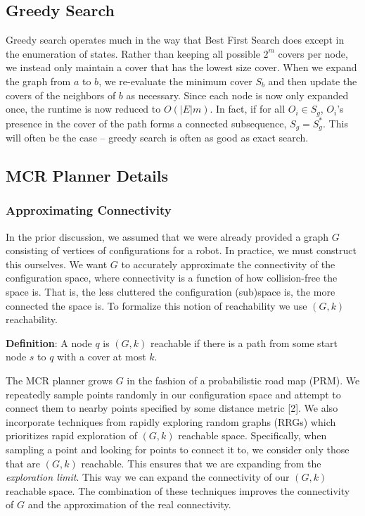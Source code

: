 \subsection{Greedy Search}
Greedy search operates much in the way that Best First Search does except in the enumeration of states. Rather than keeping all possible $2^m$ covers per node, we instead only maintain a cover that has the lowest size cover. When we expand the graph from $a$ to $b$, we re-evaluate the minimum cover $S_b$ and then update the covers of the neighbors of $b$ as necessary. Since each node is now only expanded once, the runtime is now reduced to $O(|E|m)$. In fact, if for all $O_i \in S_g$, $O_i$'s presence in the cover of the path forms a connected subsequence, $S_g = S^{*}_g$. This will often be the case -- greedy search is often as good as exact search.

\subsection{MCR Planner Details}
\subsubsection{Approximating Connectivity}
In the prior discussion, we assumed that we were already provided a graph $G$ consisting of vertices of configurations for a robot. In practice, we must construct this ourselves. We want $G$ to accurately approximate the connectivity of the configuration space, where connectivity is a function of how collision-free the space is. That is, the less cluttered the configuration (sub)space is, the more connected the space is. To formalize this notion of reachability we use $(G,k)$ reachability.

{\bf{Definition}}: A node $q$ is $(G,k)$ reachable if there is a path from some start node $s$ to $q$ with a cover at most $k$. 

The MCR planner grows $G$ in the fashion of a probabilistic road map (PRM). We repeatedly sample points randomly in our configuration space and attempt to connect them to nearby points specified by some distance metric [2]. We also incorporate techniques from rapidly exploring random graphs (RRGs) which prioritizes rapid exploration of $(G,k)$ reachable space. Specifically, when sampling a point and looking for points to connect it to, we consider only those that are $(G,k)$ reachable. This ensures that we are expanding from the \emph{exploration limit}. This way we can expand the connectivity of our $(G,k)$ reachable space. The combination of these techniques improves the connectivity of $G$ and the approximation of the real connectivity.  


